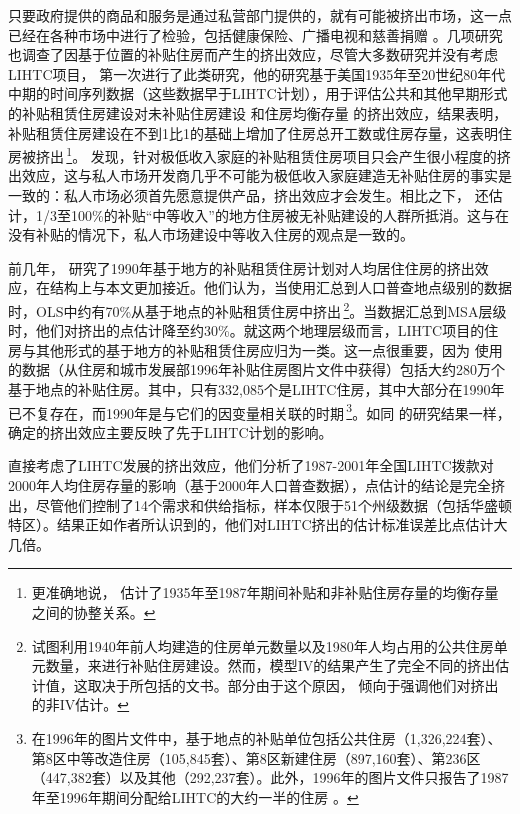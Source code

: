 \documentclass[lang=cn,11pt,a4paper]{paper}
\begin{document}
只要政府提供的商品和服务是通过私营部门提供的，就有可能被挤出市场，这一点已经在各种市场中进行了检验，包括健康保险、广播电视和慈善捐赠 \citep{Cutler1996391,Berry1999189,Andreoni2003792}。几项研究也调查了因基于位置的补贴住房而产生的挤出效应，尽管大多数研究并没有考虑LIHTC项目，\cite{Murray1983590,Murray1999107} 第一次进行了此类研究，他的研究基于美国1935年至20世纪80年代中期的时间序列数据（这些数据早于LIHTC计划），用于评估公共和其他早期形式的补贴租赁住房建设对未补贴住房建设 \citep{Murray1983590} 和住房均衡存量 \citep{Murray1999107} 的挤出效应，结果表明，补贴租赁住房建设在不到1比1的基础上增加了住房总开工数或住房存量，这表明住房被挤出\,\footnote{更准确地说，\cite{Murray1999107} 估计了1935年至1987年期间补贴和非补贴住房存量的均衡存量之间的协整关系。}。\cite{Murray1999107} 发现，针对极低收入家庭的补贴租赁住房项目只会产生很小程度的挤出效应，这与私人市场开发商几乎不可能为极低收入家庭建造无补贴住房的事实是一致的：私人市场必须首先愿意提供产品，挤出效应才会发生。相比之下，\cite{Murray1999107} 还估计，1/3至100\%的补贴“中等收入”的地方住房被无补贴建设的人群所抵消。这与在没有补贴的情况下，私人市场建设中等收入住房的观点是一致的。

前几年，\cite{Sinai20052137} 研究了1990年基于地方的补贴租赁住房计划对人均居住住房的挤出效应，在结构上与本文更加接近。他们认为，当使用汇总到人口普查地点级别的数据时，OLS中约有70\%从基于地点的补贴租赁住房中挤出\,\footnote{\cite{Sinai20052137} 试图利用1940年前人均建造的住房单元数量以及1980年人均占用的公共住房单元数量，来进行补贴住房建设。然而，模型IV的结果产生了完全不同的挤出估计值，这取决于所包括的文书。部分由于这个原因，\cite{Sinai20052137} 倾向于强调他们对挤出的非IV估计。}。当数据汇总到MSA层级时，他们对挤出的点估计降至约30\%。就这两个地理层级而言，LIHTC项目的住房与其他形式的基于地方的补贴租赁住房应归为一类。这一点很重要，因为 \cite{Sinai20052137} 使用的数据（从住房和城市发展部1996年补贴住房图片文件中获得）包括大约280万个基于地点的补贴住房。其中，只有332,085个是LIHTC住房，其中大部分在1990年已不复存在，而1990年是与它们的因变量相关联的时期\,\footnote{在1996年的图片文件中，基于地点的补贴单位包括公共住房（1,326,224套）、第8区中等改造住房（105,845套）、第8区新建住房（897,160套）、第236区（447,382套）以及其他（292,237套）。此外，1996年的图片文件只报告了1987年至1996年期间分配给LIHTC的大约一半的住房 \citep{Malpezzi2002360}。}。如同 \cite{Murray1983590,Murray1999107} 的研究结果一样，\cite{Sinai20052137} 确定的挤出效应主要反映了先于LIHTC计划的影响。

\cite{Malpezzi2002360} 直接考虑了LIHTC发展的挤出效应，他们分析了1987-2001年全国LIHTC拨款对2000年人均住房存量的影响（基于2000年人口普查数据），点估计的结论是完全挤出，尽管他们控制了14个需求和供给指标，样本仅限于51个州级数据（包括华盛顿特区）。结果正如作者所认识到的，他们对LIHTC挤出的估计标准误差比点估计大几倍。
\end{document}
